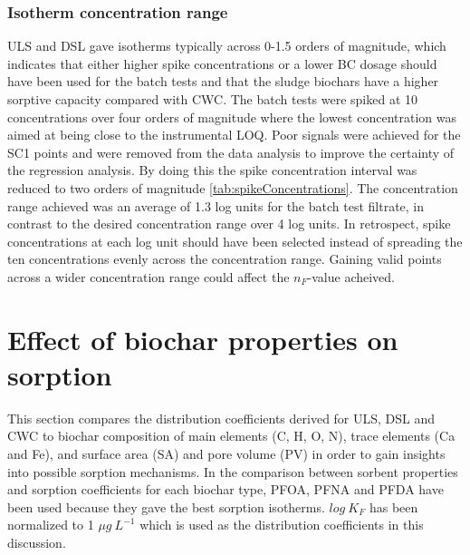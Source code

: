 \subsubsection{Isotherm concentration range}
ULS and DSL gave isotherms typically across 0-1.5 orders of magnitude, which indicates that either higher spike concentrations or a lower BC dosage should have been used for the batch tests and that the sludge biochars have a higher sorptive capacity compared with CWC. The batch tests were spiked at 10 concentrations over four orders of magnitude where the lowest concentration was aimed at being close to the instrumental LOQ. Poor signals were achieved for the SC1 points and were removed from the data analysis to improve the certainty of the regression analysis. By doing this the spike concentration interval was reduced to two orders of magnitude \cref{tab:spikeConcentrations}. The concentration range achieved was an average of 1.3 log units for the batch test filtrate, in contrast to the desired concentration range over 4 log units. In retrospect, spike concentrations at each log unit should have been selected instead of spreading the ten concentrations evenly across the concentration range. Gaining valid points across a wider concentration range could affect the $n_F$-value acheived. 


\section{Effect of biochar properties on sorption}
This section compares the distribution coefficients derived for ULS, DSL and CWC to biochar composition of main elements (C, H, O, N), trace elements (Ca and Fe), and surface area (SA) and pore volume (PV) in order to gain insights into possible sorption mechanisms. In the comparison between sorbent properties and sorption coefficients for each biochar type, PFOA, PFNA and PFDA have been used because they gave the best sorption isotherms. $log~K_F$ has been normalized to 1 $\mu g~L^{-1}$ which is used as the distribution coefficients in this discussion.

